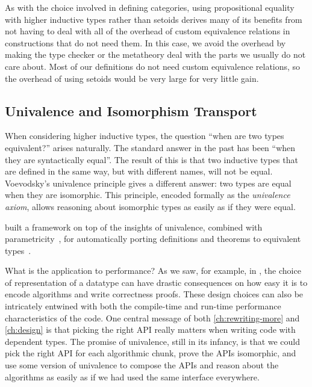 As with the choice involved in defining categories, using propositional equality with higher inductive types rather than setoids derives many of its benefits from not having to deal with all of the overhead of custom equivalence relations in constructions that do not need them.
In this case, we avoid the overhead by making the type checker or the metatheory deal with the parts we usually do not care about.
Most of our definitions do not need custom equivalence relations, so the overhead of using setoids would be very large for very little gain.

\subsection{Univalence and Isomorphism Transport}\label{sec:fixes:theory:univalence}\label{sec:univalence}
When considering higher inductive types, the question ``when are two types equivalent?'' arises naturally.
The standard answer in the past has been ``when they are syntactically equal''.
The result of this is that two inductive types that are defined in the same way, but with different names, will not be equal.
Voevodsky's univalence principle gives a different answer: two types are equal when they are isomorphic.
This principle, encoded formally as the \emph{univalence axiom}, allows reasoning about isomorphic types as easily as if they were equal.

 built a framework on top of the insights of univalence, combined with parametricity~\cite{reynolds1983types,wadler1989theorems}, for automatically porting definitions and theorems to equivalent types~\cite{Equivalences2018Tabareau,Tabareau2019TheMO}.

What is the application to performance?
As we saw, for example, in , the choice of representation of a datatype can have drastic consequences on how easy it is to encode algorithms and write correctness proofs.
These design choices can also be intricately entwined with both the compile-time and run-time performance characteristics of the code.
One central message of both \autoref{ch:rewriting-more} and \autoref{ch:design} is that picking the right API really matters when writing code with dependent types.
The promise of univalence, still in its infancy, is that we could pick the right API for each algorithmic chunk, prove the APIs isomorphic, and use some version of univalence to compose the APIs and reason about the algorithms as easily as if we had used the same interface everywhere.

